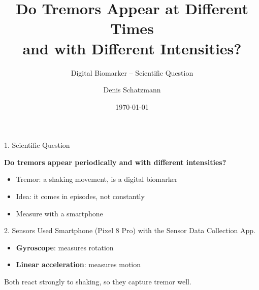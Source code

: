 \documentclass[11pt,aspectratio=169]{beamer}
\title[Tremor Analysis]{Do Tremors Appear at Different Times\\and with Different Intensities?}
\subtitle{Digital Biomarker -- Scientific Question}
\author[]{Denis Schatzmann}
\institute[]{FHNW -- Medical Software Development}
\date{\today}
\begin{document}
\begin{frame}{1. Scientific Question}
    \begin{block}{}
        \textbf{Do tremors appear periodically and with different
        intensities?}
    \end{block}

    \vspace{1em}
    \begin{itemize}
        \item Tremor: a shaking movement, is a digital biomarker
        \item Idea: it comes in episodes, not constantly
        \item Measure with a smartphone
    \end{itemize}
\end{frame}

\begin{frame}{2. Sensors Used}
    Smartphone (Pixel 8 Pro) with the Sensor Data Collection App.

    \vspace{1em}
    \begin{itemize}
        \item \textbf{Gyroscope}: measures rotation
        \item \textbf{Linear acceleration}: measures motion
    \end{itemize}

    \vspace{1em}
    Both react strongly to shaking, so they capture tremor well.
\end{frame}
\end{document}
